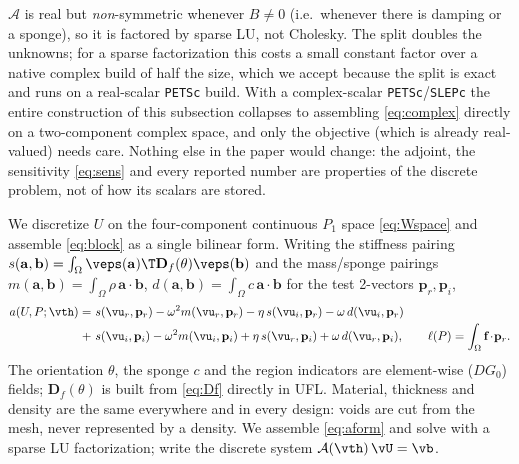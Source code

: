 \begin{remark}
\label{rem:cost}
$\mathcal A$ is real but \emph{non}-symmetric whenever $B\neq0$ (i.e.\ whenever
there is damping or a sponge), so it is factored by sparse LU, not Cholesky. The
split doubles the unknowns; for a sparse factorization this costs a small constant factor
over a native complex build of half the size, which we accept because the split is exact
and runs on a real-scalar \texttt{PETSc} build. With a complex-scalar \texttt{PETSc}/\texttt{SLEPc} the
entire construction of this subsection collapses to assembling
\eqref{eq:complex} directly on a two-component complex space, and only the
objective (which is already real-valued) needs care. Nothing else in the paper
would change: the adjoint, the sensitivity \eqref{eq:sens} and every reported
number are properties of the discrete problem, not of how its scalars are stored.
\end{remark}

We discretize $U$ on the four-component continuous $P_1$ space
\eqref{eq:Wspace} and assemble \eqref{eq:block} as a single bilinear form. Writing the stiffness pairing
$s(\mathbf a,\mathbf b)=\int_\Omega\veps(\mathbf a)\T\mathbf D_f(\theta)\veps(\mathbf b)$
and the mass/sponge pairings $m(\mathbf a,\mathbf b)=\int_\Omega\rho\,\mathbf a
\!\cdot\!\mathbf b$, $d(\mathbf a,\mathbf b)=\int_\Omega c\,\mathbf a\!\cdot\!
\mathbf b$ for the test 2-vectors $\mathbf p_r,\mathbf p_i$,
\begin{equation}
\begin{aligned}
  a(U,P;\vth)=\ &s(\vu_r,\mathbf p_r)-\omega^2 m(\vu_r,\mathbf p_r)
  -\eta\,s(\vu_i,\mathbf p_r)-\omega\,d(\vu_i,\mathbf p_r)\\[-1pt]
  +\ &s(\vu_i,\mathbf p_i)-\omega^2 m(\vu_i,\mathbf p_i)
  +\eta\,s(\vu_r,\mathbf p_i)+\omega\,d(\vu_r,\mathbf p_i),\qquad
  \ell(P)=\int_\Omega\mathbf f\!\cdot\!\mathbf p_r .
\end{aligned}
\label{eq:aform}
\end{equation}
The orientation $\theta$, the sponge $c$ and the region indicators are element-wise
($DG_0$) fields; $\mathbf D_f(\theta)$ is built from \eqref{eq:Df} directly in UFL.
Material, thickness and density are the same everywhere and in every design: voids are
cut from the mesh, never represented by a density. We assemble
\eqref{eq:aform} and solve with a sparse LU factorization; write the discrete
system $\mathcal A(\vth)\,\vU=\vb$.


